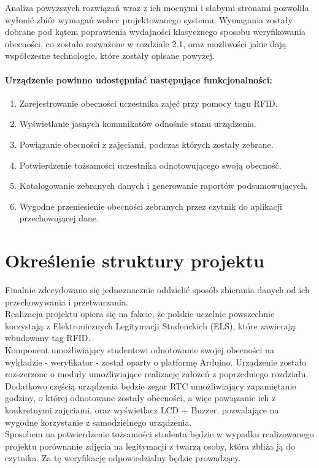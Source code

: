 \documentclass[declaration,shortabstract, mgr]{iithesis}
\begin{document}
\indent Analiza powyższych rozwiązań wraz z ich mocnymi i słabymi stronami pozwoliła wyłonić zbiór wymagań wobec projektowanego systemu. Wymagania zostały dobrane pod kątem poprawienia wydajności klasycznego sposobu weryfikowania obecności, co zostało rozważone w rozdziale 2.1, oraz możliwości jakie dają współczesne technologie, które zostały opisane powyżej.

\subsubsection{Urządzenie powinno udostępniać następujące funkcjonalności:}

\begin{enumerate}
\item Zarejestrowanie obecności uczestnika zajęć przy pomocy tagu RFID.
\item Wyświetlanie jasnych komunikatów odnośnie stanu urządzenia.
\item Powiązanie obecności z zajęciami, podczas których zostały zebrane.
\item Potwierdzenie tożsamości uczestnika odnotowującego swoją obecność.
\item Katalogowanie zebranych danych i generowanie raportów podsumowujących.
\item Wygodne przeniesienie obecności zebranych przez czytnik do aplikacji przechowującej dane.
\end{enumerate}



\chapter{Określenie struktury projektu}
\indent Finalnie zdecydowano się jednoznacznie oddzielić sposób zbierania danych od ich przechowywania i przetwarzania.\\
\indent Realizacja projektu opiera się na fakcie, że polskie uczelnie powszechnie korzystają z Elektronicznych Legitymacji Studenckich (ELS), które zawierają wbudowany tag RFID. \\
\indent Komponent umożliwiający studentowi odnotowanie swojej obecności na wykładzie - weryfikator - został oparty o platformę Arduino. Urządzenie zostało rozszerzone o moduły umożliwiające realizację założeń z poprzedniego rozdziału.\\
\indent Dodatkowo częścią urządzenia będzie zegar RTC umożliwiający zapamiętanie godziny, o której odnotowane zostały obecności, a więc powiązanie ich z konkretnymi zajęciami, oraz wyświetlacz LCD + Buzzer, pozwalające na wygodne korzystanie z samodzielnego urządzenia. \\
\indent Sposobem na potwierdzenie tożsamości studenta będzie w wypadku realizowanego projektu porównanie zdjęcia na legitymacji z twarzą osoby, która zbliża ją do czytnika. Za tę weryfikację odpowiedzialny będzie prowadzący.\\\\
\end{document}
